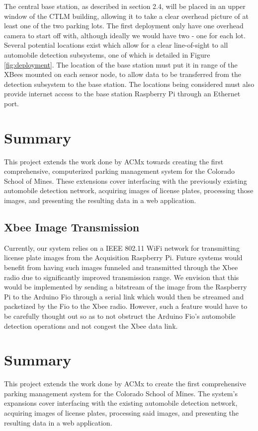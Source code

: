 \documentclass[11pt, oneside, fullpage, doublespace]{article}
\begin{document}
The central base station, as described in section 2.4, will be placed in an upper window of the CTLM building, allowing it to take a clear overhead picture of at least one of the two parking lots. The first deployment only have one overhead camera to start off with, although ideally we would have two - one for each lot. Several potential locations exist which allow for a clear line-of-sight to all automobile detection subsystems, one of which is detailed in Figure \ref{fig:deployment}. The location of the base station must put it in range of the XBees mounted on each sensor node, to allow data to be transferred from the detection subsystem to the base station. The locations being considered must also provide internet access to the base station Raspberry Pi through an Ethernet port.


\section{Summary}
This project extends the work done by ACMx towards creating the first comprehensive, computerized parking management system for the Colorado School of Mines. These extensions cover interfacing with the previously existing automobile detection network, acquiring images of license plates, processing those images, and presenting the resulting data in a web application.

\subsection{Xbee Image Transmission}
Currently, our system relies on a IEEE 802.11 WiFi network for transmitting license plate images from the Acquisition Raspberry Pi. Future systems would benefit from having such images funneled and transmitted through the Xbee radio due to significantly improved transmission range. We envision that this would be implemented by sending a bitstream of the image from the Raspberry Pi to the Arduino Fio through a serial link which would then be streamed and packetized by the Fio to the Xbee radio. However, such a feature would have to be carefully thought out so as to not obstruct the Arduino Fio's automobile detection operations and not congest the Xbee data link.

\section{Summary}

This project extends the work done by ACMx to create the first comprehensive parking management system for the Colorado School of Mines. The system's expansions cover interfacing with the existing automobile detection network, acquiring images of license plates, processing said images, and presenting the resulting data in a web application.
\end{document}
